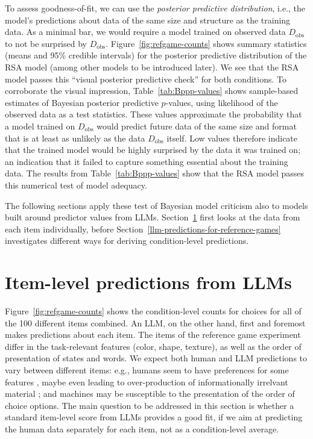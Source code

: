 \documentclass[fleqn]{article}
\begin{document}
To assess goodness-of-fit, we can use the \emph{posterior predictive distribution}, i.e., the model's predictions about data of the same size and structure as the training data.
As a minimal bar, we would require a model trained on observed data $D_{\text{obs}}$ to not be surprised by $D_{\text{obs}}$.
Figure~\ref{fig:refgame-counts} shows summary statistics (means and 95\% credible intervals) for the posterior predictive distribution of the RSA model (among other models to be introduced later).
We see that the RSA model passes this ``visual posterior predictive check'' \citep{Kruschke2011:Doing-Bayesian-} for both conditions.
To corroborate the visual impression, Table~\ref{tab:Bppp-values} shows sample-based estimates of Bayesian posterior predictive $p$-values, using likelihood of the observed data as a test statistics.
These values approximate the probability that a model trained on $D_{\text{obs}}$ would predict future data of the same size and format that is at least as unlikely as the data $D_{\text{obs}}$ itself.
Low values therefore indicate that the trained model would be highly surprised by the data it was trained on; an indication that it failed to capture something essential about the training data.
The results from Table~\ref{tab:Bppp-values} show that the RSA model passes this numerical test of model adequacy.

The following sections apply these test of Bayesian model criticism also to models built around predictor values from LLMs.
Section~\ref{sec:item-level-pred} first looks at the data from each item individually, before Section~\ref{llm-predictions-for-reference-games} investigates different ways for deriving condition-level predictions.


\section{Item-level predictions from LLMs}
\label{sec:item-level-pred}

Figure~\ref{fig:refgame-counts} shows the condition-level counts for choices for all of the 100 different items combined.
An LLM, on the other hand, first and foremost makes predictions about each item.
The items of the reference game experiment differ in the task-relevant features (color, shape, texture), as well as the order of presentation of states and words.
We expect both human and LLM predictions to vary between different items: e.g., humans seem to have preferences for some features \citep{QingFranke2013:Variations-on-a}, maybe even leading to over-production of informationally irrelvant material \citep{DegenHawkins2020:When-redundancy} ; and machines may be susceptible to the presentation of the order of choice options. 
The main question to be addressed in this section is whether a standard item-level score from LLMs provides a good fit, if we aim at predicting the human data separately for each item, not as a condition-level average.
\end{document}
